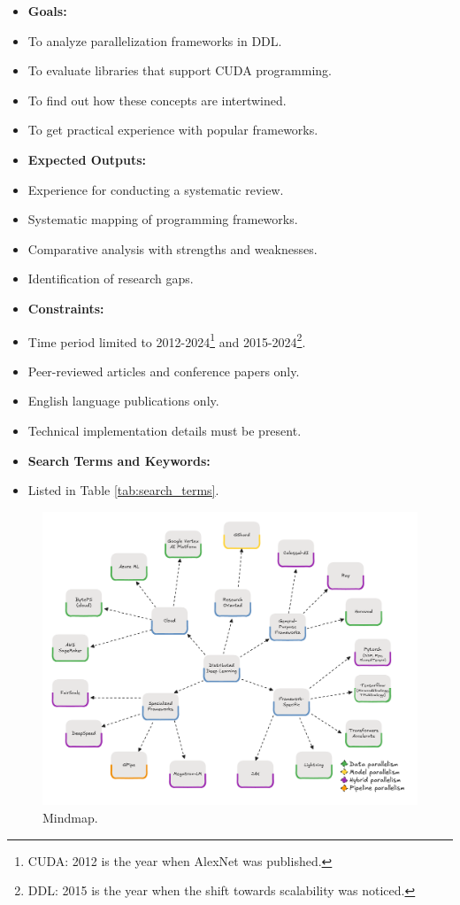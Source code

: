 \begin{itemize}
	\item \textbf{Goals:}
	\item To analyze parallelization frameworks in DDL.
	\item To evaluate libraries that support CUDA programming.
	\item To find out how these concepts are intertwined.
	\item To get practical experience with popular frameworks. \\
	\item \textbf{Expected Outputs:}
	\item Experience for conducting a systematic review.
	\item Systematic mapping of programming frameworks.
	\item Comparative analysis with strengths and weaknesses.
	\item Identification of research gaps. \\
	\item \textbf{Constraints:}
	\item Time period limited to 2012-2024\footnote{CUDA: 2012 is the year when AlexNet was published.} and
	      2015-2024\footnote{DDL: 2015 is the year when the shift towards scalability was noticed.}.
	\item Peer-reviewed articles and conference papers only.
	\item English language publications only.
	\item Technical implementation details must be present. \\
	\item \textbf{Search Terms and Keywords:}
	\item Listed in Table \ref{tab:search_terms}.
\end{itemize}

\begin{figure}[th]
	\centering
	\includegraphics[width=\linewidth]{figures/mindmap}
	\caption{Mindmap.}
	\label{fig:mindmap}
\end{figure}

